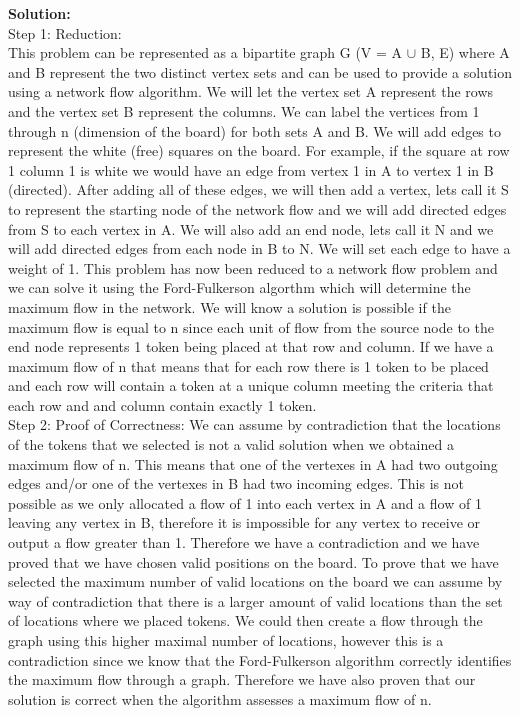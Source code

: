 \documentclass[12pt]{article}
\begin{document}
\textbf{Solution:}\\

Step 1: Reduction:\\

This problem can be represented as a bipartite graph G (V = A $\cup$ B, E) where A and B represent the two distinct vertex sets and can be used to provide a solution using a network flow algorithm. We will let the vertex set A represent the rows and the vertex set B represent the columns. We can label the vertices from 1 through n (dimension of the board) for both sets A and B. We will add edges to represent the white (free) squares on the board. For example, if the square at row 1 column 1 is white we would have an edge from vertex 1 in A to vertex 1 in B (directed). After adding all of these edges, we will then add a vertex, lets call it S to represent the starting node of the network flow and we will add directed edges from S to each vertex in A. We will also add an end node, lets call it N and we will add directed edges from each node in B to N. We will set each edge to have a weight of 1. This problem has now been reduced to a network flow problem and we can solve it using the Ford-Fulkerson algorthm which will determine the maximum flow in the network. We will know a solution is possible if the maximum flow is equal to n since each unit of flow from the source node to the end node represents 1 token being placed at that row and column. If we have a maximum flow of n that means that for each row there is 1 token to be placed and each row will contain a token at a unique column meeting the criteria that each row and and column contain exactly 1 token.\\

Step 2: Proof of Correctness: We can assume by contradiction that the locations of the tokens that we selected is not a valid solution when  we obtained a maximum flow of n. This means that one of the vertexes in A had two outgoing edges and/or one of the vertexes in B had two incoming edges. This is not possible as we only allocated a flow of 1 into each vertex in A and a flow of 1 leaving any vertex in B, therefore it is impossible for any vertex to receive or output a flow greater than 1. Therefore we have a contradiction and we have proved that we have chosen valid positions on the board. To prove that we have selected the maximum number of valid locations on the board we can assume by way of contradiction that there is a larger amount of valid locations than the set of locations where we placed tokens. We could then create a flow through the graph using this higher maximal number of locations, however this is a contradiction since we know that the Ford-Fulkerson algorithm correctly identifies the maximum flow through a graph. Therefore we have also proven that our solution is correct when the algorithm assesses a maximum flow of n.
\end{document}
